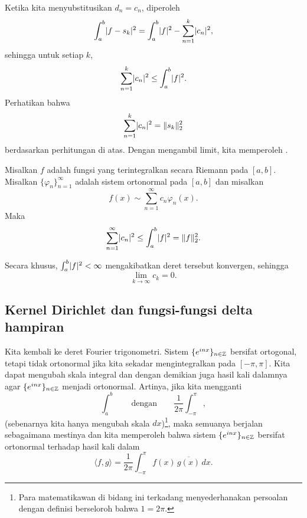 Ketika kita menyubstitusikan $d_n = c_n$, diperoleh
\begin{equation*}
\int_a^b \lvert {f-s_k} \rvert^2
=
\int_a^b \lvert {f} \rvert^2
-
\sum_{n=1}^k \lvert {c_n} \rvert^2 ,
\end{equation*}
sehingga untuk setiap $k$,
\begin{equation*}
\sum_{n=1}^k \lvert {c_n} \rvert^2
\leq
\int_a^b \lvert {f} \rvert^2 .
\end{equation*}
Perhatikan bahwa
\begin{equation*}
\sum_{n=1}^k \lvert {c_n} \rvert^2 = \lVert {s_k} \rVert_2^2
\end{equation*}
berdasarkan perhitungan di atas.
Dengan mengambil limit, kita memperoleh
\emph{}.

\begin{thm} \label{thm:bessels}
Misalkan $f$ adalah fungsi yang terintegralkan secara Riemann pada $[a,b]$.
Misalkan $\{ \varphi_n \}_{n=1}^\infty$ adalah sistem ortonormal pada $[a,b]$ dan
misalkan
\begin{equation*}
f(x) \sim \sum_{n=1}^\infty c_n \varphi_n(x) .
\end{equation*}
Maka
\begin{equation*}
\sum_{n=1}^\infty \lvert {c_n} \rvert^2
\leq
\int_a^b \lvert {f} \rvert^2
= \lVert {f} \rVert_2^2 .
\end{equation*}
\end{thm}

Secara khusus, $\int_a^b \lvert {f} \rvert^2 < \infty$ mengakibatkan deret tersebut
konvergen, sehingga
\begin{equation*}
\lim_{k \to \infty} c_k = 0 .
\end{equation*}

\subsection{Kernel Dirichlet dan fungsi-fungsi delta hampiran}

Kita kembali ke deret Fourier trigonometri.
Sistem $\{ e^{inx} \}_{n \in {\mathbb{Z}}}$ bersifat ortogonal, tetapi tidak ortonormal jika kita sekadar
mengintegralkan pada $[-\pi,\pi]$. Kita dapat mengubah skala integral
dan dengan demikian juga hasil kali dalamnya agar
$\{ e^{inx} \}_{n \in {\mathbb{Z}}}$ menjadi ortonormal. Artinya, jika kita mengganti
\begin{equation*}
\int_a^b \qquad \text{dengan} \qquad
\frac{1}{2\pi} \int_{-\pi}^\pi,
\end{equation*}
(sebenarnya kita hanya mengubah skala $dx$)\footnote{%
Para matematikawan di bidang ini terkadang menyederhanakan persoalan dengan
definisi berseloroh bahwa $1=2\pi$.},
maka semuanya berjalan sebagaimana mestinya dan kita memperoleh bahwa sistem
$\{ e^{inx} \}_{n \in {\mathbb{Z}}}$
bersifat ortonormal terhadap hasil kali dalam
\begin{equation*}
\langle f , g \rangle =
\frac{1}{2\pi} \int_{-\pi}^\pi f(x) \, \overline{g(x)} \, dx .
\end{equation*}

